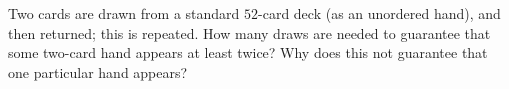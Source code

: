 Two cards are drawn from a standard $52$-card deck (as an unordered hand), and then returned; this is repeated. How many draws are needed to guarantee that some two-card hand appears at least twice? Why does this not guarantee that one particular hand appears?
